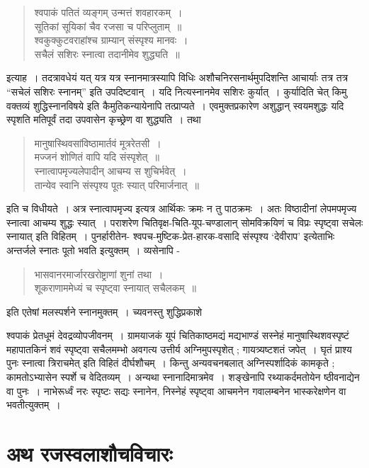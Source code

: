 {\begin{verse}
श्वपाकं पतितं व्यङ्गम् उन्मत्तं शवहारकम्~। \\
सूतिकां सूयिकां चैव रजसा च परिप्लुताम्~॥ \\
श्वकुक्कुटवराहांश्च ग्राम्यान् संस्पृश्य मानवः~। \\
सचैलं सशिरः स्नात्वा तदानीमेव शुद्ध्यति~॥
\end{verse}
इत्याह~। तदत्रावधेयं यत् यत्र यत्र स्नानमात्रस्यापि विधिः अशौचनिरसनार्थमुपदिशन्ति आचार्याः तत्र तत्र “सचेलं सशिरः स्नानम्” इति उपदिष्टवान्~। यदि नित्यस्नानमेव सशिरः कुर्यात्~। कुर्यादिति चेत् किमु वक्तव्यं शुद्धिस्नानविषये इति कैमुतिकन्यायेनापि तत्प्राप्यते~। एवमुक्तप्रकारेण अशुद्धान् स्वयमशुद्धः यदि स्पृशति मतिपूर्वं तदा उपवासेन कृच्छ्रेण वा शुद्ध्यति~। तथा 
\begin{verse}
मानुषास्थिवसांविष्ठामार्तवं मूत्ररेतसी~। \\
मज्जनं शोणितं वापि यदि संस्पृशेत्~॥ \\
स्नात्वापमृज्यलेपादीन् आचम्य स शुचिर्भवेत्~। \\ 
तान्येव स्वानि संस्पृश्य पूतः स्यात् परिमार्जनात्~॥
\end{verse}
इति च विधीयते~। अत्र स्नात्वापमृज्य इत्यत्र आर्थिकः क्रमः न तु पाठक्रमः~। अतः विष्ठादीनां लेपमपमृज्य स्नात्वा आचम्य शुद्धः स्यात्~। पराशरेण चितिवृक्ष-चिति-यूप-चण्डालान् सोमविक्रयिणं च विप्रः स्पृष्ट्वा सचेलः स्नायात् इति विहितम्~। पुनर्हारीतेन- श्वपच-मुष्टिक-प्रेत-हारक-वसादि संस्पृश्य ‘देवीराप’ इत्येताभिः अन्तर्जले स्नातः पूतो भवति इत्युक्तम्~। व्यसेनापि - 
\begin{verse}
भासवानरमार्जारखरोष्ट्राणां शुनां तथा~। \\
शूकराणाममेध्यं च स्पृष्ट्वा स्नायात् सचैलकम्~॥  
\end{verse}

इति एतेषां मलस्पर्शने स्नानमुक्तम्~। च्यवनस्तु शुद्धिप्रकाशे 

श्वपाकं प्रेतधूमं देवद्रव्योपजीवनम्~। ग्रामयाजकं यूपं चितिकाष्ठमद्यं मद्यभाण्डं सस्नेहं मानुषास्थिशवस्पृष्टं महापातकिनं शवं स्पृष्ट्वा सचैलमम्भो अवगत्य उत्तीर्य अग्निमुपस्पृशेत् ; गायत्र्यष्टशतं जपेत्~। घृतं प्राश्य पुनः स्नात्वा त्रिराचमेत् इति विहितं दीर्घशौचम्~। किन्तु अन्यवचनबलात् अग्निस्पर्शादिकं कामकृते ; कामतोऽभ्यासेन स्पर्शे च वेदितव्यम्~। अन्यथा स्नानादिमात्रमेव~। शङ्खेनापि रथ्याकर्दमतोयेन ष्ठीवनाद्येन वा पुनः~। नाभेरूर्ध्वं नरः स्पृष्टः सद्यः स्नानेन, निस्नेहं स्पृष्ट्वा आचमनेन गवालम्बनेन भास्करेक्षणेन वा भवतीत्युक्तम्~। 

\section*{अथ रजस्वलाशौचविचारः}

}
